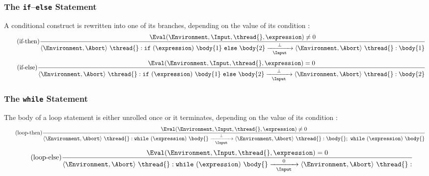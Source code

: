 \subsubsection{The \texttt{if}--\texttt{else} Statement}
A conditional construct is rewritten into one of its branches, depending on 
the value of its condition \expression{}:
\begin{equation*}
	\tag{if-then}
	\label{forec:if-then}
	\frac{
			\Eval(\Environment, \Input, \thread{}, \expression) \neq 0
		}{
			\langle \Environment, \Abort \rangle ~ \thread{}:\mathtt{if}~(\expression)~\body{1}~\mathtt{else}~\body{2}
				\xrightarrow[~~\Input~~]{\bot} 
			\langle \Environment, \Abort \rangle ~ \thread{}:\body{1}
		}
\end{equation*}
\begin{equation*}
	\tag{if-else}
	\label{forec:if-else}
	\frac{
			\Eval(\Environment, \Input, \thread{}, \expression) = 0
		}{
			\langle \Environment, \Abort \rangle ~ \thread{}:\mathtt{if}~(\expression)~\body{1}~\mathtt{else}~\body{2}
				\xrightarrow[~~\Input~~]{\bot} 
			\langle \Environment, \Abort \rangle ~ \thread{}:\body{2}
		}
\end{equation*}

\subsubsection{The \texttt{while} Statement}
The body of a loop statement is either unrolled once
or it terminates, depending 
on the value of its condition \expression{}:
\begin{equation*}
	\tag{loop-then}
	\label{forec:loop-then}
	\frac{
			\Eval(\Environment, \Input, \thread{}, \expression) \neq 0
		}{
			\langle \Environment, \Abort \rangle ~ \thread{}:\mathtt{while}~(\expression)~\body{}
				\xrightarrow[~~\Input~~]{\bot} 
			\langle \Environment, \Abort \rangle ~ \thread{}:\body{};~\mathtt{while}~(\expression)~\body{}
		}
\end{equation*}
\begin{equation*}
	\tag{loop-else}
	\label{forec:loop-else}
	\frac{
			\Eval(\Environment, \Input, \thread{}, \expression) = 0
		}{
			\langle \Environment, \Abort \rangle ~ \thread{}:\mathtt{while}~(\expression)~\body{}
				\xrightarrow[~~\Input~~]{0} 
			\langle \Environment, \Abort \rangle ~ \thread{}:
		}
\end{equation*}

